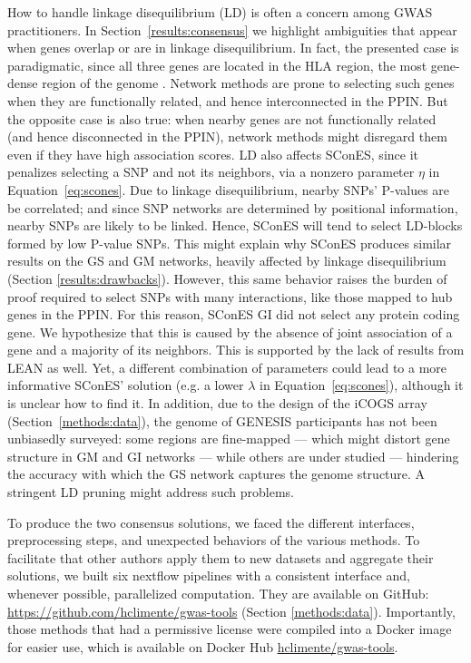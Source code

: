 \documentclass[10pt,letterpaper]{article}
\begin{document}
How to handle linkage disequilibrium (LD) is often a concern among GWAS practitioners. In Section~\ref{results:consensus} we highlight ambiguities that appear when genes overlap or are in linkage disequilibrium. In fact, the presented case is paradigmatic, since all three genes are located in the HLA region, the most gene-dense region of the genome \cite{Xie2003}. Network methods are prone to selecting such genes when they are functionally related, and hence interconnected in the PPIN. But the opposite case is also true: when nearby genes are not functionally related (and hence disconnected in the PPIN), network methods might disregard them even if they have high association scores. LD also affects SConES, since it penalizes selecting a SNP and not its neighbors, via a nonzero parameter $\eta$ in Equation~\ref{eq:scones}. Due to linkage disequilibrium, nearby SNPs' P-values are be correlated; and since SNP networks are determined by positional information, nearby SNPs are likely to be linked. Hence, SConES will tend to select LD-blocks formed by low P-value SNPs. This might explain why SConES produces similar results on the GS and GM networks, heavily affected by linkage disequilibrium (Section \ref{results:drawbacks}). However, this same behavior raises the burden of proof required to select SNPs with many interactions, like those mapped to hub genes in the PPIN. For this reason, SConES GI did not select any protein coding gene. We hypothesize that this is caused by the absence of joint association of a gene and a majority of its neighbors. This is supported by the lack of results from LEAN as well. Yet, a different combination of parameters could lead to a more informative SConES' solution (e.g. a lower \(\lambda\) in Equation~\ref{eq:scones}), although it is unclear how to find it. In addition, due to the design of the iCOGS array (Section~\ref{methods:data}), the genome of GENESIS participants has not been unbiasedly surveyed: some regions are fine-mapped --- which might distort gene structure in GM and GI networks --- while others are under studied --- hindering the accuracy with which the GS network captures the genome structure. A stringent LD pruning might address such problems. 

To produce the two consensus solutions, we faced the different interfaces, preprocessing steps, and unexpected behaviors of the various methods. To facilitate that other authors apply them to new datasets and aggregate their solutions, we built six nextflow pipelines \cite{di_tommaso_nextflow_2017} with a consistent interface and, whenever possible, parallelized computation. They are available on GitHub: \url{https://github.com/hclimente/gwas-tools} (Section \ref{methods:data}). Importantly, those methods that had a permissive license were compiled into a Docker image for easier use, which is available on Docker Hub \href{https://hub.docker.com/r/hclimente/gwas-tools}{hclimente/gwas-tools}.
\end{document}
